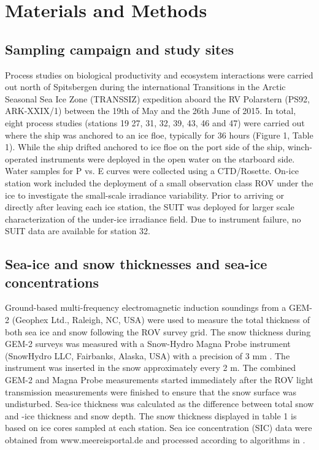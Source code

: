 \documentclass[draft]{agujournal2018}
\begin{document}
\section{Materials and Methods}

\subsection{Sampling campaign and study sites}

Process studies on biological productivity and ecosystem interactions were carried out north of Spitsbergen during the international Transitions in the Arctic Seasonal Sea Ice Zone (TRANSSIZ) expedition aboard the RV Polarstern (PS92, ARK-XXIX/1) between the 19th of May and the 26th June of 2015. In total, eight process studies (stations 19 27, 31, 32, 39, 43, 46 and 47) were carried out where the ship was anchored to an ice floe, typically for 36 hours (Figure 1, Table 1). While the ship drifted anchored to ice floe on the port side of the ship, winch-operated instruments were deployed in the open water on the starboard side. Water samples for P vs. E curves were collected using a CTD/Rosette. On-ice station work included the deployment of a small observation class ROV under the ice to investigate the small-scale irradiance variability. Prior to arriving or directly after leaving each ice station, the SUIT was deployed for larger scale characterization of the under-ice irradiance field. Due to instrument failure, no SUIT data are available for station 32.

\subsection{Sea-ice and snow thicknesses and sea-ice concentrations}

Ground-based multi-frequency electromagnetic induction soundings from a GEM-2 (Geophex Ltd., Raleigh, NC, USA) were used to measure the total thickness of both sea ice and snow following the ROV survey grid. The snow thickness during GEM-2 surveys was measured with a Snow-Hydro Magna Probe instrument (SnowHydro LLC, Fairbanks, Alaska, USA) with a precision of 3 mm \citep{Sturm2006}. The instrument was inserted in the snow approximately every 2 m. The combined GEM-2 and Magna Probe measurements started immediately after the ROV light transmission measurements were finished to ensure that the snow surface was undisturbed. Sea-ice thickness was calculated as the difference between total snow and -ice thickness and snow depth. The snow thickness displayed in table 1 is based on ice cores sampled at each station. Sea ice concentration (SIC) data were obtained from www.meereisportal.de and processed according to algorithms in \citet{Spreen2008}.
\end{document}
